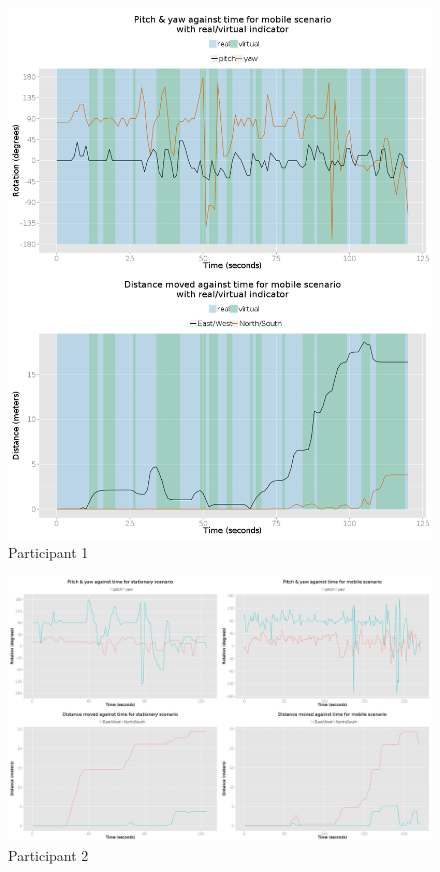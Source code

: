 \begin{figure}[h]
	\begin{center}
		\includegraphics[width=\linewidth]{images/24072014_1200_2up.png}
		\caption{Participant 1}
		\label{participant_1_2up}
	\end{center}
\end{figure}


	\begin{figure}[h]
		\begin{center}
			\includegraphics[width=\linewidth]{images/25072014_1300_4up.png}
			\caption{Participant 2}
			\label{participant_2_4up}
		\end{center}
	\end{figure}


